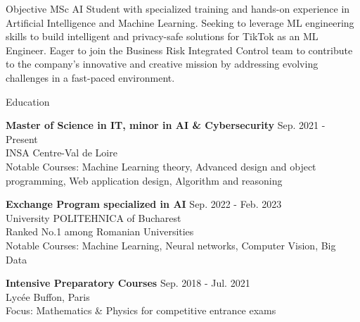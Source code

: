 \documentclass{resume} %
\begin{document}

\begin{rSection}{Objective}
{MSc AI Student with specialized training and hands-on experience in Artificial Intelligence and Machine Learning. Seeking to leverage ML engineering skills to build intelligent and privacy-safe solutions for TikTok as an ML Engineer. Eager to join the Business Risk Integrated Control team to contribute to the company’s innovative and creative mission by addressing evolving challenges in a fast-paced environment.}
\end{rSection}


\begin{rSection}{Education}

{\bf Master of Science in IT, minor in AI \& Cybersecurity} \hfill {Sep. 2021 - Present} \\ 
INSA Centre-Val de Loire \smallskip \\
Notable Courses: Machine Learning theory, Advanced design and object programming, Web application design, Algorithm and reasoning

{\bf Exchange Program specialized in AI} \hfill {Sep. 2022 - Feb. 2023} \\
University POLITEHNICA of Bucharest \smallskip \\
Ranked No.1 among Romanian Universities \\
Notable Courses: Machine Learning, Neural networks, Computer Vision, Big Data

{\bf Intensive Preparatory Courses} \hfill {Sep. 2018 - Jul. 2021} \\
Lycée Buffon, Paris \smallskip \\
Focus: Mathematics \& Physics for competitive entrance exams
\end{rSection}
\end{document}
